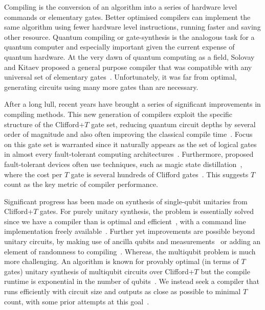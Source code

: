 \documentclass[notitlepage]{article}
\theoremstyle{definition}
\theoremstyle{problem}
\theoremstyle{lemma}
\begin{document}
		Compiling is the conversion of an algorithm into a series of hardware level commands or elementary gates.   Better optimised compilers can implement the same algorithm using fewer hardware level instructions, running faster and saving other resource.  Quantum compiling or gate-synthesis is the analogous task for a quantum computer and especially important given the current expense of quantum hardware.  At the very dawn of quantum computing as a field, Solovay and Kitaev proposed a general purpose compiler that was compatible with any universal set of elementary gates~\cite{kitaev02,dawson05,fowler11}.  Unfortunately, it was far from optimal, generating circuits using many more gates than are necessary.   
		
		After a long lull, recent years have brought a series of significant improvements in compiling methods.  This new generation of compilers exploit the specific structure of the Clifford+$T$ gate set, reducing quantum circuit depths by several order of magnitude and also often improving the classical compile time~\cite{kliuchnikov13,selinger13,gosset14,RS14}.   Focus on this gate set is warranted since it naturally appears as the set of logical gates in almost every fault-tolerant computing architectures~\cite{ReviewPaper}.  Furthermore, proposed fault-tolerant devices often use techniques, such as magic state distillation~\cite{BraKit05},  where the cost per $T$ gate is several hundreds of Clifford gates~\cite{RHG01a,Fowler12,gorman17}.  This suggests $T$ count as the key metric of compiler performance.
		
		Significant progress has been made on synthesis of single-qubit unitaries from Clifford+$T$ gates.  For purely unitary synthesis, the problem is essentially solved since we have a compiler than is optimal and efficient~\cite{kliuchnikov13,RS14}, with a command line implementation freely available~\cite{gridsynth}.  Further yet improvements are possible beyond unitary circuits, by making use of ancilla qubits and measurements~\cite{paetznick14,bocharov15,bocharov15b} or adding an element of randomness to compiling~\cite{campbell17shorter,hastings2016mixing}.  Whereas, the multiqubit problem is much more challenging.  An algorithm is known for provably optimal (in terms of $T$ gates) unitary synthesis of multiqubit circuits over Clifford+$T$ but the compile runtime is exponential in the number of qubits~\cite{gosset14}.  We instead seek a compiler that runs efficiently with circuit size and outputs as close as possible to minimal $T$ count, with some prior attempts at this goal~\cite{amy2013meet}.  
		
\end{document}
